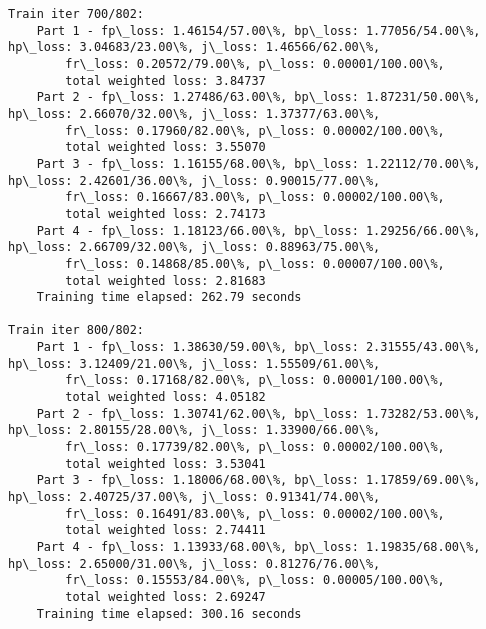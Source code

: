 \documentclass[11pt]{article}
\begin{document}
\begin{Verbatim}[commandchars=\\\{\}]
Train iter 700/802:
	Part 1 - fp\_loss: 1.46154/57.00\%, bp\_loss: 1.77056/54.00\%, hp\_loss: 3.04683/23.00\%, j\_loss: 1.46566/62.00\%, 
		fr\_loss: 0.20572/79.00\%, p\_loss: 0.00001/100.00\%, 
		total weighted loss: 3.84737
	Part 2 - fp\_loss: 1.27486/63.00\%, bp\_loss: 1.87231/50.00\%, hp\_loss: 2.66070/32.00\%, j\_loss: 1.37377/63.00\%, 
		fr\_loss: 0.17960/82.00\%, p\_loss: 0.00002/100.00\%, 
		total weighted loss: 3.55070
	Part 3 - fp\_loss: 1.16155/68.00\%, bp\_loss: 1.22112/70.00\%, hp\_loss: 2.42601/36.00\%, j\_loss: 0.90015/77.00\%, 
		fr\_loss: 0.16667/83.00\%, p\_loss: 0.00002/100.00\%, 
		total weighted loss: 2.74173
	Part 4 - fp\_loss: 1.18123/66.00\%, bp\_loss: 1.29256/66.00\%, hp\_loss: 2.66709/32.00\%, j\_loss: 0.88963/75.00\%, 
		fr\_loss: 0.14868/85.00\%, p\_loss: 0.00007/100.00\%, 
		total weighted loss: 2.81683
	Training time elapsed: 262.79 seconds

Train iter 800/802:
	Part 1 - fp\_loss: 1.38630/59.00\%, bp\_loss: 2.31555/43.00\%, hp\_loss: 3.12409/21.00\%, j\_loss: 1.55509/61.00\%, 
		fr\_loss: 0.17168/82.00\%, p\_loss: 0.00001/100.00\%, 
		total weighted loss: 4.05182
	Part 2 - fp\_loss: 1.30741/62.00\%, bp\_loss: 1.73282/53.00\%, hp\_loss: 2.80155/28.00\%, j\_loss: 1.33900/66.00\%, 
		fr\_loss: 0.17739/82.00\%, p\_loss: 0.00002/100.00\%, 
		total weighted loss: 3.53041
	Part 3 - fp\_loss: 1.18006/68.00\%, bp\_loss: 1.17859/69.00\%, hp\_loss: 2.40725/37.00\%, j\_loss: 0.91341/74.00\%, 
		fr\_loss: 0.16491/83.00\%, p\_loss: 0.00002/100.00\%, 
		total weighted loss: 2.74411
	Part 4 - fp\_loss: 1.13933/68.00\%, bp\_loss: 1.19835/68.00\%, hp\_loss: 2.65000/31.00\%, j\_loss: 0.81276/76.00\%, 
		fr\_loss: 0.15553/84.00\%, p\_loss: 0.00005/100.00\%, 
		total weighted loss: 2.69247
	Training time elapsed: 300.16 seconds


\end{Verbatim}
\end{document}

